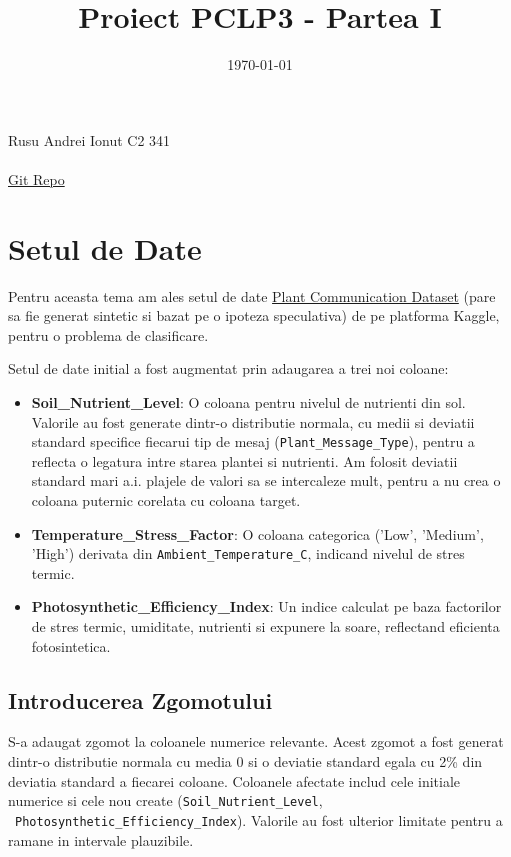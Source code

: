 \documentclass[11pt, a4paper]{article}
\title{Proiect PCLP3 - Partea I }
\date{\today}
\makeatletter
\newcommand{\studentname}{Rusu Andrei Ionut C2 341}
\newcommand{\git}{\href{https://github.com/russsssso/PCLP3}{Git Repo}}
\renewcommand{\maketitle}{
  \begin{center}
    \Large \studentname \\
    \Huge \@title \\[1em]
    \normalsize \git \\[0.2em]
    \large \@date
    \vspace{2em}
  \end{center}
  \par
  \thispagestyle{empty}
}
\makeatother
\begin{document}
\maketitle
\thispagestyle{empty}
\clearpage
{}

\section{Setul de Date}

Pentru aceasta tema am ales setul de date \href{https://www.kaggle.com/datasets/efeyldz/plant-communication-dataset-classification?resource=download}{Plant Communication Dataset} (pare sa fie generat sintetic si bazat pe o ipoteza speculativa) de pe platforma Kaggle, pentru o problema de clasificare.

Setul de date initial a fost augmentat prin adaugarea a trei noi coloane:
\sloppy
\begin{itemize}
    \item  \textbf{Soil\_Nutrient\_Level}: O coloana pentru nivelul de nutrienti din sol. Valorile au fost generate dintr-o distributie normala, cu medii si deviatii standard specifice fiecarui tip de mesaj (\texttt{Plant\_Message\_Type}), pentru a reflecta o legatura intre starea plantei si nutrienti. Am folosit deviatii standard mari a.i. plajele de valori sa se intercaleze mult, pentru a nu crea o coloana puternic corelata cu coloana target.
    \item \textbf{Temperature\_Stress\_Factor}: O coloana categorica ('Low', 'Medium', 'High') derivata din \texttt{Ambient\_Temperature\_C}, indicand nivelul de stres termic.
    \item \textbf{Photosynthetic\_Efficiency\_Index}: Un indice calculat pe baza factorilor de stres termic, umiditate, nutrienti si expunere la soare, reflectand eficienta fotosintetica.
\end{itemize}

\subsection{Introducerea Zgomotului}
S-a adaugat zgomot la coloanele numerice relevante. Acest zgomot a fost generat dintr-o distributie normala cu media 0 si o deviatie standard egala cu 2\% din deviatia standard a fiecarei coloane. Coloanele afectate includ cele initiale numerice si cele nou create (\texttt{Soil\_Nutrient\_Level}, \  \texttt{Photosynthetic\_Efficiency\_Index}). Valorile au fost ulterior limitate pentru a ramane in intervale plauzibile.
\end{document}
